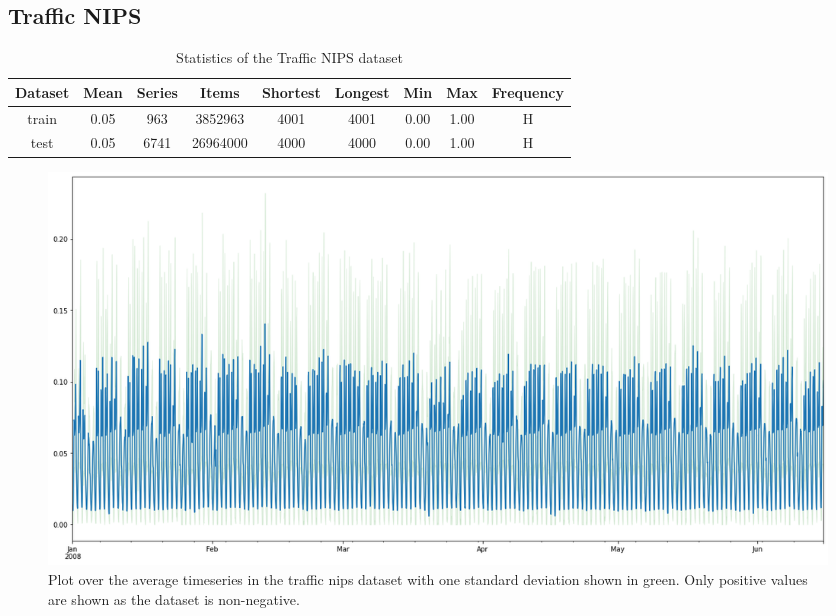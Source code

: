 \clearpage
\subsection{Traffic NIPS}
\begin{table}[htb]
    \begin{tabular}{||c | c c c c c c c c ||}
        \hline
        Dataset & Mean & Series & Items    & Shortest & Longest & Min  & Max  & Frequency \\ [0.5ex]
        \hline\hline
        train   & 0.05 & 963    & 3852963  & 4001     & 4001    & 0.00 & 1.00 & H         \\
        \hline
        test    & 0.05 & 6741   & 26964000 & 4000     & 4000    & 0.00 & 1.00 & H         \\
        \hline
    \end{tabular}
    \caption{Statistics of the Traffic NIPS dataset}
\end{table}


\begin{figure}[htb]
    \centering
    \includegraphics[width=\linewidth]{./img/traffic_nips_plot.png}
    \caption{Plot over the average timeseries in the traffic nips dataset with one standard deviation shown in green. Only positive values are shown as the dataset is non-negative.}
    \label{fig:traffic_nips_plot}
    \endminipage\hfill
\end{figure}

